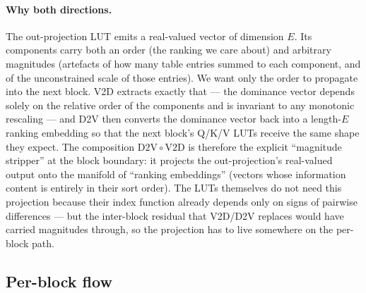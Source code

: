 \documentclass[11pt]{article}
\begin{document}
\paragraph{Why both directions.}
The out-projection LUT emits a real-valued vector of dimension $E$.
Its components carry both an order (the ranking we care about) and arbitrary magnitudes (artefacts of how many table entries summed to each component, and of the unconstrained scale of those entries).
We want only the order to propagate into the next block.
V2D extracts exactly that --- the dominance vector depends solely on the relative order of the components and is invariant to any monotonic rescaling --- and D2V then converts the dominance vector back into a length-$E$ ranking embedding so that the next block's Q/K/V LUTs receive the same shape they expect.
The composition $\mathrm{D2V} \circ \mathrm{V2D}$ is therefore the explicit ``magnitude stripper'' at the block boundary: it projects the out-projection's real-valued output onto the manifold of ``ranking embeddings'' (vectors whose information content is entirely in their sort order).
The LUTs themselves do not need this projection because their index function already depends only on signs of pairwise differences --- but the inter-block residual that V2D/D2V replaces would have carried magnitudes through, so the projection has to live somewhere on the per-block path.

\subsection{Per-block flow}
\label{sec:current:flow}
\end{document}
